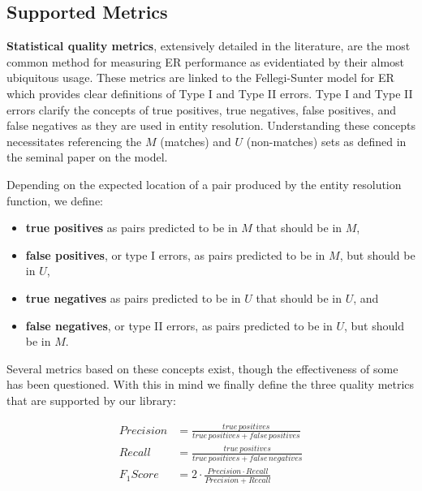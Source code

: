 \documentclass[a4paper,twoside]{article}
\begin{document}
    \subsection{Supported Metrics}\label{sec:metrics}
    \textbf{Statistical quality metrics}, extensively detailed in the
    literature\cite{manning2008,hitesh2012}, are the most common method for
    measuring ER performance as evidentiated by their almost
    ubiquitous usage\cite{fever2009,Goga2015,deepm2020,eager2021}.
    These metrics are linked to the Fellegi-Sunter model for ER
    which provides clear definitions of Type I and Type II
    errors\cite{winkler1990}.
    Type I and Type II errors clarify the concepts of true positives, true
    negatives, false positives, and false negatives as they are used in entity
    resolution.
    Understanding these concepts necessitates referencing the $M$ (matches) and
    $U$ (non-matches) sets as defined in the seminal paper on the model.

    Depending on the expected location of a pair produced by the entity
    resolution function, we define:

    \begin{itemize}
        \item \textbf{true positives} as pairs predicted to be in $M$ that
        should be in $M$,
        \item \textbf{false positives}, or type I errors, as pairs predicted to
        be in $M$, but should be in $U$,
        \item \textbf{true negatives} as pairs predicted to be in $U$ that
        should be in $U$, and
        \item \textbf{false negatives}, or type II errors, as pairs predicted to
        be in $U$, but should be in $M$.
    \end{itemize}

    Several metrics based on these concepts exist, though the effectiveness of
    some has been questioned\cite{Goga2015}.
    With this in mind we finally define the three quality metrics that are
    supported by our library:

    \begin{align}
    Precision&=\frac{true\,positives}{true\,positives + false\,positives} \\
    Recall&=\frac{true\,positives}{true\,positives + false\,negatives} \\
    F_1 Score&=2 \cdot \frac{Precision \cdot Recall}{Precision+Recall}
    \end{align}
\end{document}
